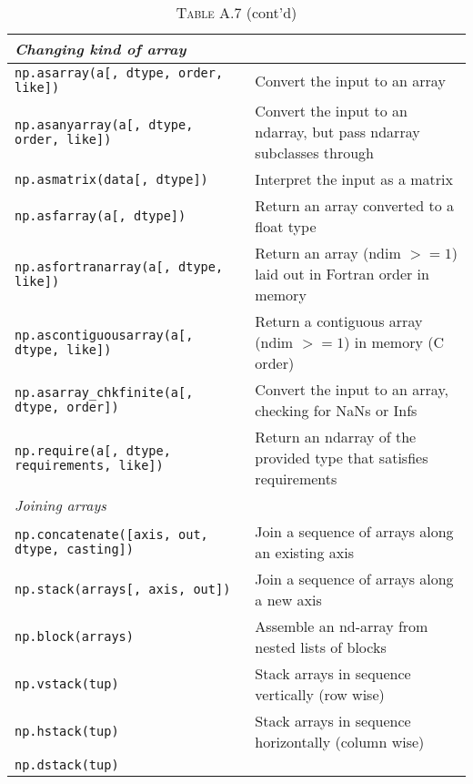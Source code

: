 \documentclass[a4paper,11pt]{book}
\numberwithin{figure}{chapter}
\numberwithin{table}{chapter}
\begin{document}
\begin{appendices}
\begin{table}
	\caption*{\textsc{Table A.7} (cont'd)}
	\begin{tabular}{p{7.5cm}p{8.5cm}}
		\midrule
		\multicolumn{1}{l}{\textit{Changing kind of array}} \\ 
		\midrule
                \texttt{np.asarray(a[, dtype, order, like])}&       
		Convert the input to an array\\
                \texttt{np.asanyarray(a[, dtype, order, like])}&
                Convert the input to an ndarray, but pass ndarray subclasses through\\
                \texttt{np.asmatrix(data[, dtype])}&
                Interpret the input as a matrix\\
                \texttt{np.asfarray(a[, dtype])}&
                Return an array converted to a float type\\
                \texttt{np.asfortranarray(a[, dtype, like])}&
                Return an array (ndim $>= 1$) laid out in Fortran order in memory\\
                \texttt{np.ascontiguousarray(a[, dtype, like])}&
                Return a contiguous array (ndim $>= 1$) in memory (C order)\\
                \texttt{np.asarray\_chkfinite(a[, dtype, order])}&
                Convert the input to an array, checking for NaNs or Infs\\
                \texttt{np.require(a[, dtype, requirements, like])}&
                Return an ndarray of the provided type that satisfies requirements\\
		\midrule
		\multicolumn{1}{l}{\textit{Joining arrays}} \\
		\midrule
                \texttt{np.concatenate([axis, out, dtype, casting])} &
                Join a sequence of arrays along an existing axis\\
                \texttt{np.stack(arrays[, axis, out])} &
                Join a sequence of arrays along a new axis\\
                \texttt{np.block(arrays)} &
                Assemble an nd-array from nested lists of blocks\\
                \texttt{np.vstack(tup)} &
                Stack arrays in sequence vertically (row wise)\\
                \texttt{np.hstack(tup)} &
                Stack arrays in sequence horizontally (column wise)\\
                \texttt{np.dstack(tup)} &

\end{tabular}
\end{table}
\end{appendices}
\end{document}
